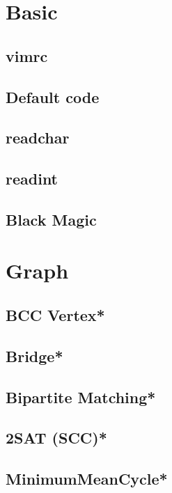 \section{Basic}
\subsection{vimrc}

\subsection{Default code}

\subsection{readchar}

\subsection{readint}

\subsection{Black Magic}


\section{Graph}
\subsection{BCC Vertex*} %

\subsection{Bridge*} %

\subsection{Bipartite Matching*} %

\subsection{2SAT (SCC)*} %

\subsection{MinimumMeanCycle*} %


